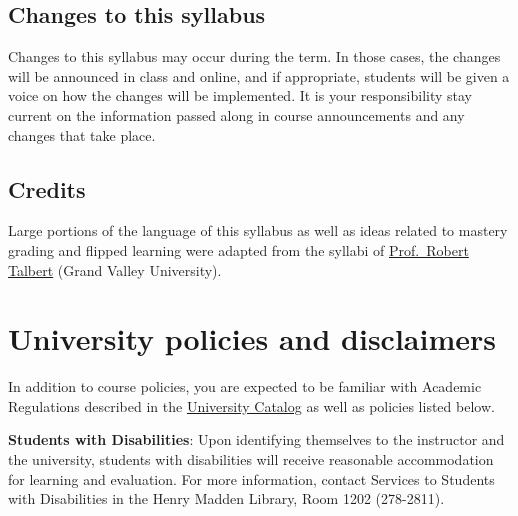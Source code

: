 \hypertarget{changes-to-this-syllabus}{%
\subsection{Changes to this syllabus}\label{changes-to-this-syllabus}}

Changes to this syllabus may occur during the term. In those cases, the
changes will be announced in class and online, and if appropriate,
students will be given a voice on how the changes will be implemented.
It is your responsibility stay current on the information passed along
in course announcements and any changes that take place.

\hypertarget{credits}{%
\subsection{Credits}\label{credits}}

Large portions of the language of this syllabus as well as ideas related
to mastery grading and flipped learning were adapted from the syllabi of
\href{https://hackmd.io/@rtalbert235}{Prof.~Robert Talbert} (Grand
Valley University).

\hypertarget{university-policies-and-disclaimers}{%
\section{University policies and
disclaimers}\label{university-policies-and-disclaimers}}

In addition to course policies, you are expected to be familiar with
Academic Regulations described in the
\href{http://www.fresnostate.edu/catalog/academic-regulations/}{University
Catalog} as well as policies listed below.

\textbf{Students with Disabilities}: Upon identifying themselves to the
instructor and the university, students with disabilities will receive
reasonable accommodation for learning and evaluation. For more
information, contact Services to Students with Disabilities in the Henry
Madden Library, Room 1202 (278-2811).

